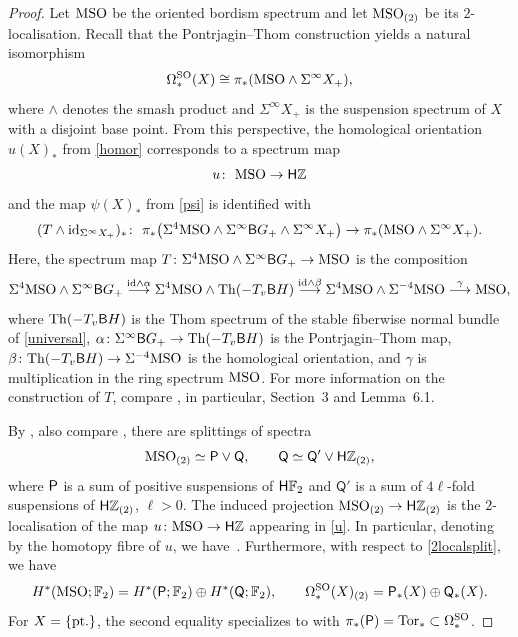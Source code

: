 \documentclass[10pt,a4paper]{amsart}
\numberwithin{equation}{section}
\newcommand{\F}{\mathbb{F}}
\newcommand{\Z}{\mathbb{Z}}
\newcommand{\SO}{\mathrm{SO}}
\newcommand{\id}{{\rm id}}
\newcommand{\MSO}{{\rm MSO}}
\newcommand{\sB}{{\sf B}}
\newcommand{\Tor}{{\rm Tor}}
\begin{document}
\begin{proof}
Let $\MSO$ be the oriented bordism spectrum and let $\MSO_{(2)}$ be its $2$-localisation.
Recall that the Pontrjagin--Thom construction yields a natural isomorphism
\[
 \Omega^{\SO}_*(X) \cong \pi_*(\MSO \wedge \Sigma^{\infty} X_+),
\]
where $\wedge$ denotes the smash product and $\Sigma^{\infty} X_+$ is the suspension spectrum of $X$ with a disjoint base point.
From this perspective, the homological orientation $u(X)_*$ from \eqref{homor} corresponds to a spectrum map
\begin{equation} \label{u}
 u \colon\ \MSO \to \mathsf{H}\Z
\end{equation}
and the map $\psi(X)_*$ from \eqref{psi} is identified with
\[
(T \wedge \id_{\Sigma^{\infty} X_+})_* \colon\ \pi_*\big( \Sigma^4 \MSO \wedge \Sigma^{\infty} \sB G_+ \wedge \Sigma^{\infty} X_+\big) \to \pi_*(\MSO \wedge \Sigma^{\infty}X_+) .
\]
Here, the spectrum map $T \colon \Sigma^4 \MSO \wedge \Sigma^{\infty} \sB G_+ \to \MSO$ is the composition
\[
 \Sigma^4 \MSO \wedge \Sigma^{\infty} \sB G_+ \stackrel{\id \wedge \alpha}{\longrightarrow} \Sigma^4 \MSO \wedge {\rm Th}(-T_v \sB H) \stackrel{\id \wedge \beta}{\longrightarrow} \Sigma^4 \MSO \wedge \Sigma^{-4} \MSO \stackrel{\gamma}{\longrightarrow} \MSO,
 \]
where ${\rm Th}(-T_v \sB H)$ is the Thom spectrum of the stable fiberwise normal bundle of \eqref{universal}, $\alpha \colon \Sigma^{\infty} \sB G_+ \to {\rm Th}(-T_v \sB H)$ is the Pontrjagin--Thom map, $\beta \colon {\rm Th}(-T_v \sB H) \to \Sigma^{-4} \MSO$ is the homological orientation, and $\gamma$ is multiplication in the ring spectrum $\MSO$.
For more information on the construction of $T$, compare \cite{Fuehring_bordism}, in particular, Section~3 and Lemma~6.1.

By \cite[Theorem 5]{Wall60}, also compare \cite[proof of~Theorem 14.1]{CF}, there are splittings of spectra
\begin{gather} \label{2localsplit}
 \MSO_{(2)} \simeq \sf{P} \vee \sf{Q} , \qquad \sf{Q} \simeq \mathsf{Q'} \vee \mathsf{H} \Z_{(2)},
 \end{gather}
where $\sf{P}$ is a sum of positive suspensions of ${\sf H}\F_2$ and $\mathsf{Q'}$ is a sum of $4\ell$-fold suspensions of ${\sf H}\Z_{(2)}$, $\ell > 0$.
The induced projection $\MSO_{(2)} \to \mathsf{H}\Z_{(2)}$ is the $2$-localisation of the map ${u \colon \MSO \to \mathsf{H}\Z}$ appearing in \eqref{u}.
In particular, denoting by \smash{$\widehat \MSO \subset \MSO$} the homotopy fibre of $u$, we have~\smash{$ ( \widehat \MSO)_{(2)} \simeq \sf{P} \vee \sf{Q'}$}.
Furthermore, with respect to \eqref{2localsplit}, we have
\begin{equation} \label{splitorbord}
 H^*(\MSO; \F_2) = H^*(\mathsf{P}; \F_2) \oplus H^*( \mathsf{Q}; \F_2) , \qquad \Omega^{\SO}_*(X)_{(2)} = \mathsf{P}_*(X) \oplus \mathsf{Q}_*(X) .
\end{equation}
For $X=\{\rm pt.\}$, the second equality specializes to \smash{$\big(\Omega^{\SO}_*\big)_{(2)} = \pi_*( \mathsf{P}) \oplus \pi_*(\mathsf{Q})$} with $\pi_*(\mathsf{P}) = \Tor_* \subset \Omega^{\SO}_*$.


\end{proof}
\end{document}
